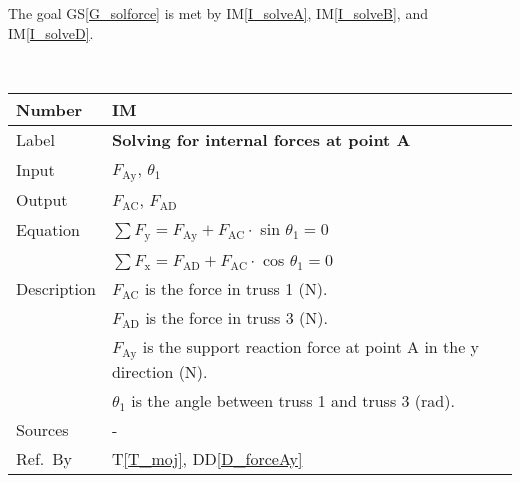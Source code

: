 \documentclass[12pt]{article}
\newcommand{\colAwidth}{0.13\textwidth}
\newcommand{\colBwidth}{0.82\textwidth}
\newcommand{\ddref}[1]{DD\ref{#1}}
\newcommand{\tref}[1]{T\ref{#1}}
\newcommand{\gsref}[1]{GS\ref{#1}}
\newcounter{instnum} %
\newcommand{\iref}[1]{IM\ref{#1}}
\begin{document}
The goal \gsref{G_solforce} is met by \iref{I_solveA}, \iref{I_solveB}, and 
\iref{I_solveD}.

~\newline


\noindent
\begin{minipage}{\textwidth}
	\renewcommand*{\arraystretch}{1.5}
	\begin{tabular}{| p{\colAwidth} | p{\colBwidth}|}
		\hline
		\rowcolor[gray]{0.9}
		Number& IM{instnum}\theinstnum \label{I_solveA}\\
		\hline
		Label& \bf Solving for internal forces at point A\\
		\hline
		Input& $F_{\text{Ay}}$, $\theta_1$\\
		\hline
		Output& $F_{\text{{AC}}}$, $F_{\text{{AD}}}$ \\
		\hline
		Equation& $\sum F_\text{y} = F_{\text{Ay}} + F_{\text{{AC}}} \cdot $ 
		sin $\theta_1 = 0$ \\
		&$\sum F_\text{x} = F_{\text{{AD}}} + F_{\text{{AC}}} \cdot $ cos 
		$\theta_1 = 0$ \\
		\hline
		Description&$F_{\text{{AC}}}$ is the force in truss 1 (N).\\
		&$F_{\text{{AD}}}$ is the force in truss 3 (N).\\
		&$F_{\text{Ay}}$ is the support reaction force at point A in the y 
		direction (N).\\		
		&$\theta_1$ is the angle between truss 1 and truss 3 (\si{\radian}).\\
		\hline
		Sources& - \\
		\hline
		Ref.\ By & \tref{T_moj}, \ddref{D_forceAy} \\
		\hline
	\end{tabular}
\end{minipage}\\

~\newline
\end{document}
